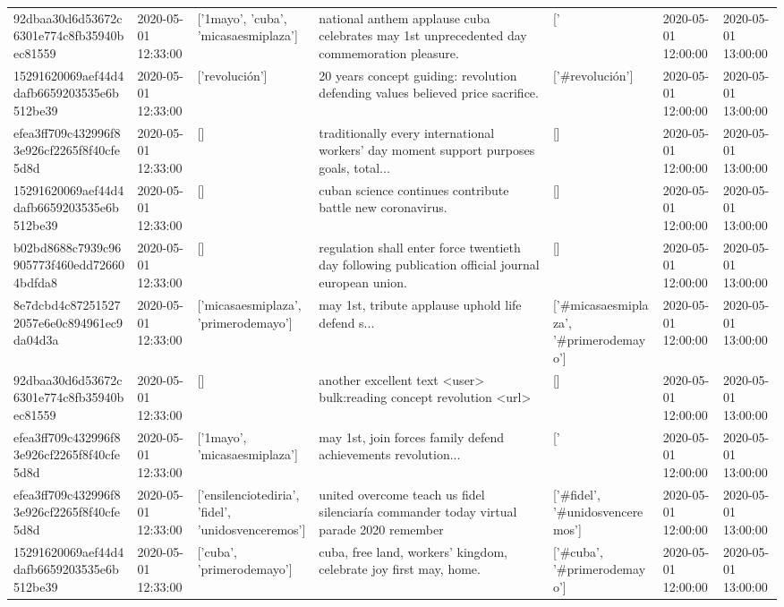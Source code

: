 \begin{tabular}{lllllll}
92dbaa30d6d53672c6301e774c8fb35940bec81559 & 2020-05-01 12:33:00 & ['1mayo', 'cuba', 'micasaesmiplaza'] & national anthem applause cuba celebrates may 1st unprecedented day commemoration pleasure. & ['#1mayo', '#cuba', '#micasaesmiplaza'] & 2020-05-01 12:00:00 & 2020-05-01 13:00:00 \\
15291620069aef44d4dafb6659203535e6b512be39 & 2020-05-01 12:33:00 & ['revolución'] & 20 years concept guiding: revolution defending values believed price sacrifice. & ['#revolución'] & 2020-05-01 12:00:00 & 2020-05-01 13:00:00 \\
efea3ff709c432996f83e926cf2265f8f40cfe5d8d & 2020-05-01 12:33:00 & [] & traditionally every international workers' day moment support purposes goals, total... & [] & 2020-05-01 12:00:00 & 2020-05-01 13:00:00 \\
15291620069aef44d4dafb6659203535e6b512be39 & 2020-05-01 12:33:00 & [] & cuban science continues contribute battle new coronavirus. & [] & 2020-05-01 12:00:00 & 2020-05-01 13:00:00 \\
b02bd8688c7939c96905773f460edd726604bdfda8 & 2020-05-01 12:33:00 & [] & regulation shall enter force twentieth day following publication official journal european union. & [] & 2020-05-01 12:00:00 & 2020-05-01 13:00:00 \\
8e7dcbd4c872515272057e6e0c894961ec9da04d3a & 2020-05-01 12:33:00 & ['micasaesmiplaza', 'primerodemayo'] & may 1st, tribute applause uphold life defend s... & ['#micasaesmiplaza', '#primerodemayo'] & 2020-05-01 12:00:00 & 2020-05-01 13:00:00 \\
92dbaa30d6d53672c6301e774c8fb35940bec81559 & 2020-05-01 12:33:00 & [] & another excellent text <user> bulk:reading concept revolution <url> & [] & 2020-05-01 12:00:00 & 2020-05-01 13:00:00 \\
efea3ff709c432996f83e926cf2265f8f40cfe5d8d & 2020-05-01 12:33:00 & ['1mayo', 'micasaesmiplaza'] & may 1st, join forces family defend achievements revolution... & ['#1mayo', '#micasaesmiplaza'] & 2020-05-01 12:00:00 & 2020-05-01 13:00:00 \\
efea3ff709c432996f83e926cf2265f8f40cfe5d8d & 2020-05-01 12:33:00 & ['ensilenciotediria', 'fidel', 'unidosvenceremos'] & united overcome teach us fidel silenciaría commander today virtual parade 2020 remember & ['#fidel', '#unidosvenceremos'] & 2020-05-01 12:00:00 & 2020-05-01 13:00:00 \\
15291620069aef44d4dafb6659203535e6b512be39 & 2020-05-01 12:33:00 & ['cuba', 'primerodemayo'] & cuba, free land, workers' kingdom, celebrate joy first may, home. & ['#cuba', '#primerodemayo'] & 2020-05-01 12:00:00 & 2020-05-01 13:00:00 \\

\end{tabular}

